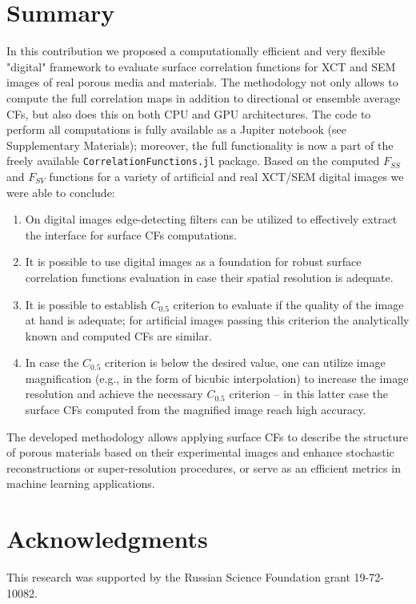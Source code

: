 \documentclass[reprint,amsmath,amssymb,aps,pre,showkeys,showpacs]{revtex4-1}
\newcommand{\code}[1]{\colorbox{light-gray}{\texttt{#1}}}
\begin{document}
\section{Summary}
\label{sec:summary}
In this contribution we proposed a computationally efficient and very flexible
"digital" framework to evaluate surface correlation functions for XCT and SEM
images of real porous media and materials. The methodology not only allows to
compute the full correlation maps in addition to directional or ensemble average
CFs, but also does this on both CPU and GPU architectures. The code to perform
all computations is fully available as a Jupiter notebook (see Supplementary
Materials); moreover, the full functionality is now a part of the freely
available \code{CorrelationFunctions.jl} package. Based on the computed $F_{SS}$
and $F_{SV}$ functions for a variety of artificial and real XCT/SEM digital
images we were able to conclude:
\begin{enumerate}
  \item On digital images edge-detecting filters can be utilized to effectively
    extract the interface for surface CFs computations.
  \item It is possible to use digital images as a foundation for robust surface
    correlation functions evaluation in case their spatial resolution is
    adequate.
  \item It is possible to establish $C_{0.5}$ criterion to evaluate if the
    quality of the image at hand is adequate; for artificial images passing this
    criterion the analytically known and computed CFs are similar.
  \item In case the $C_{0.5}$ criterion is below the desired value, one can
    utilize image magnification (e.g., in the form of bicubic interpolation) to
    increase the image resolution and achieve the necessary $C_{0.5}$ criterion
    -- in this latter case the surface CFs computed from the magnified image
    reach high accuracy.
\end{enumerate}
The developed methodology allows applying surface CFs to describe the structure
of porous materials based on their experimental images and enhance stochastic
reconstructions or super-resolution procedures, or serve as an efficient metrics
in machine learning applications.

\section{Acknowledgments}
This research was supported by the Russian Science Foundation grant
19-72-10082.
\end{document}
